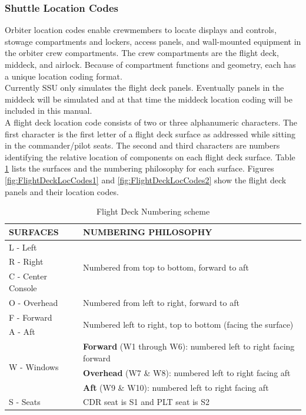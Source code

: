 \documentclass[13pt]{article}
\begin{document}
\begin{multicols*}{2}
\subsubsection{Shuttle Location Codes}
Orbiter location codes enable crewmembers to locate displays and controls, stowage compartments and lockers, access panels, and wall-mounted equipment in the orbiter crew compartments. The crew compartments are the flight deck, middeck, and airlock. Because of compartment functions and geometry, each has a unique location coding format.
\\
Currently SSU only simulates the flight deck panels. Eventually panels in the middeck will be simulated and at that time the middeck location coding will be included in this manual.
\\
A flight deck location code consists of two or three alphanumeric characters. The first character is the first letter of a flight deck surface as addressed while sitting in the commander/pilot seats.
The second and third characters are numbers identifying the relative location of components on each flight deck surface. Table \ref{tab:PanelNumbering} lists the surfaces and the numbering philosophy for each surface.
Figures \ref{fig:FlightDeckLocCodes1} and \ref{fig:FlightDeckLocCodes2} show the flight deck panels and their location codes.
\begin{table}[H]
  \begin{tabularx}{\linewidth}{l | X}
    SURFACES & NUMBERING PHILOSOPHY \\
    \hline
    L - Left & \multirow{3}{\linewidth}{Numbered from top to bottom, forward to aft} \\
    R - Right & \\
    C - Center Console & \\
    \hline
    O - Overhead & Numbered from left to right, forward to aft \\
    \hline
    F - Forward & \multirow{2}{\linewidth}{Numbered left to right, top to bottom (facing the surface)} \\
    A - Aft & \\
    \hline
    \multirow{3}{*}{W - Windows} & \textbf{Forward} (W1 through W6): numbered left to right facing forward \\
    & \textbf{Overhead} (W7 \& W8): numbered left to right facing aft \\
    & \textbf{Aft} (W9 \& W10): numbered left to right facing aft \\
    \hline
    S - Seats & CDR seat is S1 and PLT seat is S2
  \end{tabularx}
  \caption{Flight Deck Numbering scheme}
  \label{tab:PanelNumbering}
\end{table}
\end{multicols*}
\end{document}
